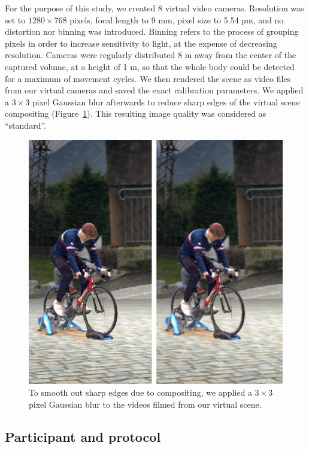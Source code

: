 For the purpose of this study, we created 8 virtual video cameras. Resolution was set to \(1280 \times 768\) pixels, focal length to 9 mm, pixel size to 5.54 µm, and no distortion nor binning was introduced. Binning refers to the process of grouping pixels in order to increase sensitivity to light, at the expense of decreasing resolution. Cameras were regularly distributed 8 m away from the center of the captured volume, at a height of 1 m, so that the whole body could be detected for a maximum of movement cycles. We then rendered the scene as video files from our virtual cameras and saved the exact calibration parameters. We applied a \(3 \times 3\) pixel Gaussian blur afterwards to reduce sharp edges of the virtual scene compositing (Figure~\ref{fig_smooth}). This resulting image quality was considered as “standard”.

\begin{figure}[!ht]
	\centering
	\def\svgwidth{1\columnwidth}
	\fontsize{10pt}{10pt}\selectfont
	\includegraphics[width=.98\linewidth]{"../Chap4/Figures/Fig_Smooth.png"}
	\caption{To smooth out sharp edges due to compositing, we applied a \(3 \times 3\) pixel Gaussian blur to the videos filmed from our virtual scene.}
	\label{fig_smooth}
\end{figure}


\subsection{Participant and protocol}

